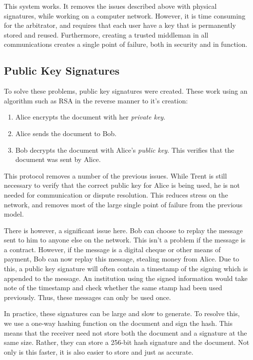 			This system works.
			It removes the issues described above with physical signatures, while working on a computer network.
			However, it is time consuming for the arbitrator, and requires that each user have a key that is permanently stored and reused.
			Furthermore, creating a trusted middleman in all communications creates a single point of failure, both in security and in function.

		\subsection{Public Key Signatures}
			To solve these problems, public key signatures were created.
			These work using an algorithm such as RSA in the reverse manner to it's creation:
			\begin{enumerate}
				\item Alice encrypts the document with her \emph{private key}.
				\item Alice sends the document to Bob.
				\item Bob decrypts the document with Alice's \emph{public key}.
					This verifies that the document was sent by Alice.
			\end{enumerate}

			This protocol removes a number of the previous issues.
			While Trent is still necessary to verify that the correct public key for Alice is being used, he is not needed for communication or dispute resolution.
			This reduces stress on the network, and removes most of the large single point of failure from the previous model.

			There is however, a significant issue here.
			Bob can choose to replay the message sent to him to anyone else on the network.
			This isn't a problem if the message is a contract.
			However, if the message is a digital cheque or other means of payment, Bob can now replay this message, stealing money from Alice.
			Due to this, a public key signature will often contain a timestamp of the signing which is appended to the message.
			An institution using the signed information would take note of the timestamp and check whether the same stamp had been used previously.
			Thus, these messages can only be used once.

			In practice, these signatures can be large and slow to generate.
			To resolve this, we use a one-way hashing function on the document and sign the hash.
			This means that the receiver need not store both the document and a signature at the same size.
			Rather, they can store a 256-bit hash signature and the document.
			Not only is this faster, it is also easier to store and just as accurate.

